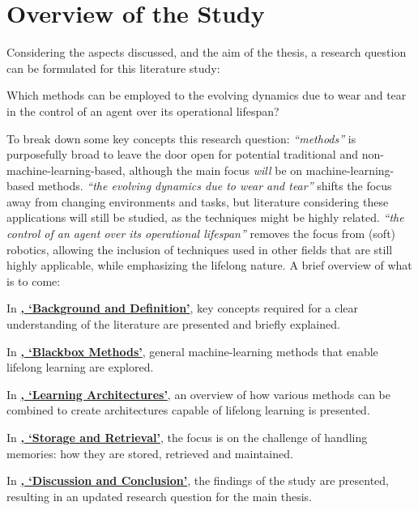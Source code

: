 \section{Overview of the Study}\label{sec:overview}
Considering the aspects discussed, and the aim of the thesis, a research question can be formulated for this literature study:

\begin{displayquote}
    Which methods can be employed to  the evolving dynamics due to wear and tear in the control of an agent over its operational lifespan?
\end{displayquote}

To break down some key concepts this research question: \emph{``methods''} is purposefully broad to leave the door open for potential traditional and non-machine-learning-based, although the main focus \emph{will} be on machine-learning-based methods.
\emph{``the evolving dynamics due to wear and tear''} shifts the focus away from changing environments and tasks, but literature considering these applications will still be studied, as the techniques might be highly related. \emph{``the control of an agent over its operational lifespan''} removes the focus from (soft) robotics,  allowing the inclusion of techniques used in other fields that are still highly applicable, while emphasizing the lifelong nature.
A brief overview of what is to come:

In \hyperref[ch:background]{\textbf{, `Background and Definition'}}, key concepts required for a clear understanding of the literature are presented and briefly explained.

In \hyperref[ch:blackbox]{\textbf{, `Blackbox Methods'}}, general machine-learning methods that enable lifelong learning are explored.

In \hyperref[ch:architecture]{\textbf{, `Learning Architectures'}}, an overview of how various methods can be combined to create architectures capable of lifelong learning is presented.

In \hyperref[ch:storage]{\textbf{, `Storage and Retrieval'}}, the focus is on the challenge of handling memories: how they are stored, retrieved and maintained.

In \hyperref[ch:discussion]{\textbf{, `Discussion and Conclusion'}}, the findings of the study are presented, resulting in an updated research question for the main thesis.